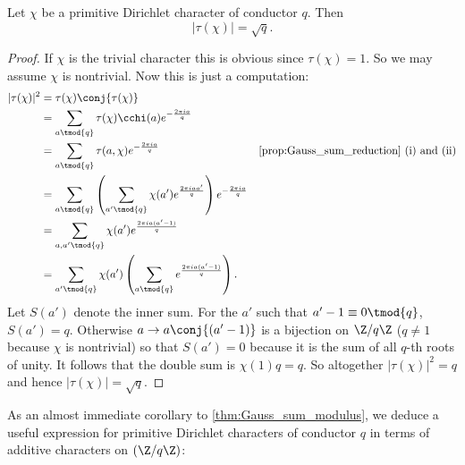         \begin{theorem}\label{thm:Gauss_sum_modulus}
          Let $\chi$ be a primitive Dirichlet character of conductor $q$. Then
          \[
            |\tau(\chi)| = \sqrt{q}.
          \]
        \end{theorem}
        \begin{proof}
          If $\chi$ is the trivial character this is obvious since $\tau(\chi) = 1$. So we may assume $\chi$ is nontrivial. Now this is just a computation:
          \begin{align*}
            |\tau(\chi)|^{2} &= \tau(\chi)\conj{\tau(\chi)} \\
            &= \sum_{a \tmod{q}}\tau(\chi)\cchi(a)e^{-\frac{2\pi ia}{q}} \\
            &=  \sum_{a \tmod{q}}\tau(a,\chi)e^{-\frac{2\pi ia}{q}} & \text{\cref{prop:Gauss_sum_reduction} (i) and (ii)} \\
            &= \sum_{a \tmod{q}}\left(\sum_{a' \tmod{q}}\chi(a')e^{\frac{2\pi iaa'}{q}}\right)e^{-\frac{2\pi ia}{q}} \\
            &= \sum_{a,a' \tmod{q}}\chi(a')e^{\frac{2\pi ia(a'-1)}{q}} \\
            &= \sum_{a' \tmod{q}}\chi(a')\left(\sum_{a \tmod{q}}e^{\frac{2\pi ia(a'-1)}{q}}\right).
          \end{align*}
          Let $S(a')$ denote the inner sum. For the $a'$ such that $a'-1 \equiv 0 \tmod{q}$, $S(a') = q$. Otherwise $a \to a\conj{(a'-1)}$ is a bijection on $\Z/q\Z$ ($q \neq 1$ because $\chi$ is nontrivial) so that $S(a') = 0$ because it is the sum of all $q$-th roots of unity. It follows that the double sum is $\chi(1)q = q$. So altogether $|\tau(\chi)|^{2} = q$ and hence $|\tau(\chi)| = \sqrt{q}$.
        \end{proof}

        As an almost immediate corollary to \cref{thm:Gauss_sum_modulus}, we deduce a useful expression for primitive Dirichlet characters of conductor $q$ in terms of additive characters on $(\Z/q\Z)$:

